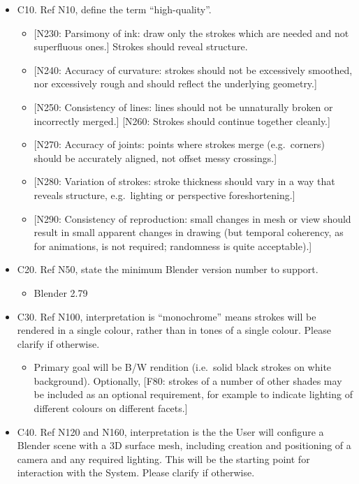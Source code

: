 \begin{itemize}
\tightlist
\item
  C10. Ref N10, define the term ``high-quality''.

  \begin{itemize}
  \tightlist
  \item
    {[}N230: Parsimony of ink: draw only the strokes which are needed
    and not superfluous ones.{]} Strokes should reveal structure.
  \item
    {[}N240: Accuracy of curvature: strokes should not be excessively
    smoothed, nor excessively rough and should reflect the underlying
    geometry.{]}
  \item
    {[}N250: Consistency of lines: lines should not be unnaturally
    broken or incorrectly merged.{]} {[}N260: Strokes should continue
    together cleanly.{]}
  \item
    {[}N270: Accuracy of joints: points where strokes merge
    (e.g.~corners) should be accurately aligned, not offset messy
    crossings.{]}
  \item
    {[}N280: Variation of strokes: stroke thickness should vary in a way
    that reveals structure, e.g.~lighting or perspective
    foreshortening.{]}
  \item
    {[}N290: Consistency of reproduction: small changes in mesh or view
    should result in small apparent changes in drawing (but temporal
    coherency, as for animations, is not required; randomness is quite
    acceptable).{]}
  \end{itemize}
\item
  C20. Ref N50, state the minimum Blender version number to support.

  \begin{itemize}
  \tightlist
  \item
    Blender 2.79
  \end{itemize}
\item
  C30. Ref N100, interpretation is ``monochrome'' means strokes will be
  rendered in a single colour, rather than in tones of a single colour.
  Please clarify if otherwise.

  \begin{itemize}
  \tightlist
  \item
    Primary goal will be B/W rendition (i.e.~solid black strokes on
    white background). Optionally, {[}F80: strokes of a number of other
    shades may be included as an optional requirement, for example to
    indicate lighting of different colours on different facets.{]}
  \end{itemize}
\item
  C40. Ref N120 and N160, interpretation is the the User will configure
  a Blender scene with a 3D surface mesh, including creation and
  positioning of a camera and any required lighting. This will be the
  starting point for interaction with the System. Please clarify if
  otherwise.


\end{itemize}

